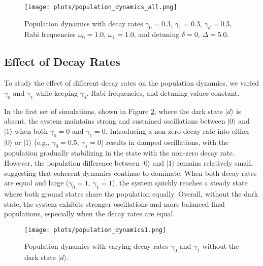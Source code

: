 \documentclass{article}
\begin{document}
\begin{figure}[h!]
    \centering
    \texttt{[image: plots/population\_dynamics\_all.png]}
    \caption{Population dynamics with decay rates \(\gamma_0 = 0.3\), \(\gamma_1 = 0.3\), \(\gamma_d = 0.3\), Rabi frequencies \(\omega_0 = 1.0\), \(\omega_1 = 1.0\), and detuning \(\delta = 0\), \(\Delta = 5.0\).}
    \label{fig:pop_dyn3}
\end{figure}



\subsection{Effect of Decay Rates}
To study the effect of different decay rates on the population dynamics, we varied \(\gamma_0\) and \(\gamma_1\) while keeping \(\gamma_d\), Rabi frequencies, and detuning values constant.

In the first set of simulations, shown in Figure \ref{fig:no_dark_state}, where the dark state \(|d\rangle\) is absent, the system maintains strong and sustained oscillations between \(|0\rangle\) and \(|1\rangle\) when both \(\gamma_0 = 0\) and \(\gamma_1 = 0\). Introducing a non-zero decay rate into either \(|0\rangle\) or \(|1\rangle\) (e.g., \(\gamma_{0} = 0.5\), \(\gamma_{1} = 0\)) results in damped oscillations, with the population gradually stabilizing in the state with the non-zero decay rate. However, the population difference between \(|0\rangle\) and \(|1\rangle\) remains relatively small, suggesting that coherent dynamics continue to dominate. When both decay rates are equal and large (\(\gamma_{0} = 1\), \(\gamma_{1} = 1\)), the system quickly reaches a steady state where both ground states share the population equally. Overall, without the dark state, the system exhibits stronger oscillations and more balanced final populations, especially when the decay rates are equal.

\begin{figure}[h!]
    \centering
    \texttt{[image: plots/population\_dynamics1.png]}
    \caption{Population dynamics with varying decay rates \(\gamma_{0}\) and \(\gamma_{1}\) without the dark state \(|d\rangle\).}
    \label{fig:no_dark_state}
\end{figure}
\end{document}
